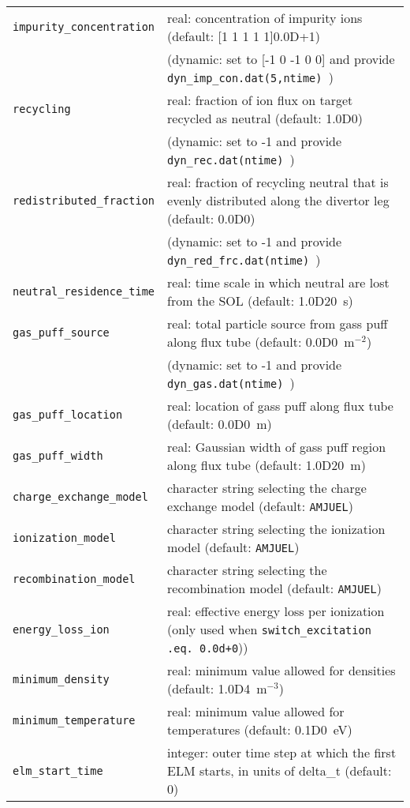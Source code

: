\documentclass[amsmath,amssymb,a4]{revtex4-2}
\begin{document}
\begin{table}[h]
\begin{center}
\begin{tabular}{|| l  | l ||}
    {\tt impurity\_concentration}  & real: concentration of impurity ions (default: [1 1 1 1 1]0.0D+1) \\ 
     & (dynamic: set to [-1 0 -1 0 0] and provide {\tt dyn\_imp\_con.dat(5,ntime) }) \\ \hline
    {\tt recycling}              & real: fraction of ion flux on target recycled as neutral (default: 1.0D0) \\ 
     & (dynamic: set to -1 and provide {\tt dyn\_rec.dat(ntime) }) \\ \hline
    {\tt redistributed\_fraction}& real: fraction of recycling neutral that is evenly distributed along the divertor leg (default: 0.0D0) \\
     & (dynamic: set to -1 and provide {\tt dyn\_red\_frc.dat(ntime) }) \\ \hline
    {\tt neutral\_residence\_time}& real: time scale in which neutral are lost from the SOL (default: 1.0D20~s) \\ \hline
    {\tt gas\_puff\_source}      & real: total particle source from gass puff along flux tube (default: 0.0D0~m$^{-2}$) \\ 
     & (dynamic: set to -1 and provide {\tt dyn\_gas.dat(ntime) }) \\ \hline
    {\tt gas\_puff\_location}    & real: location of gass puff along flux tube (default: 0.0D0~m) \\ \hline
    {\tt gas\_puff\_width}       & real: Gaussian width of gass puff region along flux tube (default: 1.0D20~m) \\ \hline
    {\tt charge\_exchange\_model}& character string selecting the charge exchange model (default: {\tt AMJUEL}) \\ \hline
    {\tt ionization\_model}      & character string selecting the ionization model (default: {\tt AMJUEL}) \\ \hline
    {\tt recombination\_model}   & character string selecting the recombination model (default: {\tt AMJUEL}) \\ \hline
    {\tt energy\_loss\_ion}      & real: effective energy loss per ionization (only used when {\tt switch\_excitation .eq. 0.0d+0})) \\ \hline
    {\tt minimum\_density}       & real: minimum value allowed for densities (default: 1.0D4~m$^{-3}$) \\ \hline
    {\tt minimum\_temperature}   & real: minimum value allowed for temperatures (default: 0.1D0~eV) \\ \hline
    {\tt elm\_start\_time}   	 & integer: outer time step at which the first ELM starts, in units of delta\_t (default: 0) \\ \hline

\end{tabular}
\end{center}
\end{table}
\end{document}
